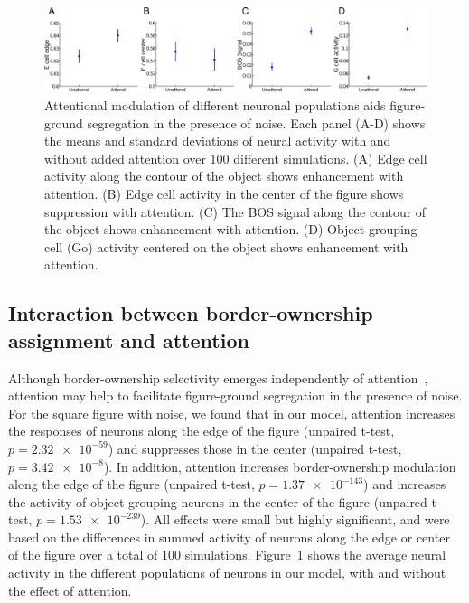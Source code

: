 \begin{figure}[t!]
\centering
\includegraphics[width=\textwidth]{Contour/figs/Fig8.eps}
\makeatletter
\let\@currsize\normalsize
\caption[Quantitative comparison of attentional modulation across neuronal populations for figure in noise]{Attentional modulation of different neuronal populations aids figure-ground segregation in the presence of noise. Each panel (A-D) shows the means and standard deviations of neural activity with and without added attention over 100 different simulations. (A) Edge cell activity along the contour of the object shows enhancement with attention. (B) Edge cell activity in the center of the figure shows suppression with attention. (C) The BOS signal along the contour of the object shows enhancement with attention. (D) Object grouping cell (Go) activity centered on the object shows enhancement with attention.}
\label{Fig:Attention_modulation}
\end{figure}

\subsection{Interaction between border-ownership assignment and attention} 
\label{sec:BOS-att}

Although border-ownership selectivity emerges independently of attention~\citep{Qiu_etal07}, attention may help to facilitate figure-ground segregation in the presence of noise.  For the square figure with noise, we found that in our model, attention increases the responses of neurons along the edge of the figure (unpaired t-test, $p=\num{2.32e-59}$) and suppresses those in the center (unpaired t-test,
$p=\num{3.42e-8}$). In addition, attention increases border-ownership
modulation along the edge of the figure (unpaired t-test, $p=\num{1.37e-143}$) and increases the activity of object grouping
neurons in the center of the figure (unpaired t-test, $p=\num{1.53e-239}$). All effects were small but highly significant,
and were based on the differences in summed activity of neurons along
the edge or center of the figure over a total of 100 simulations.
Figure~\ref{Fig:Attention_modulation} shows the average neural activity in the different populations of neurons in our model, with and without the effect of attention.  

